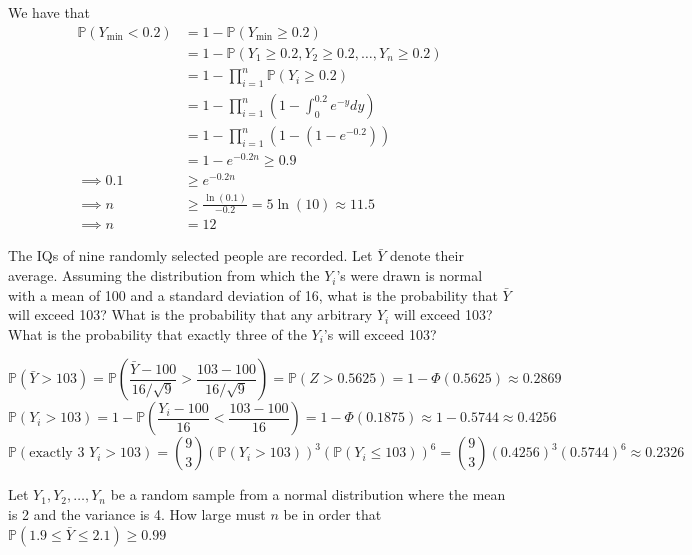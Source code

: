 \documentclass{article}
\renewcommand{\P}{\mathbb{P}}
\begin{document}
\begin{probset}
\begin{prob}[\textbf{3.10.6}]
    \begin{soln}
        We have that
        \begin{align*}
            \P(Y_{\min} < 0.2) &= 1 - \P(Y_{\min} \geq 0.2) \\
            &= 1 - \P(Y_1 \geq 0.2, Y_2 \geq 0.2, \ldots, Y_n \geq 0.2) \\
            &= 1 - \prod_{i=1}^n \P(Y_i \geq 0.2) \\
            &= 1 - \prod_{i=1}^n \left( 1 - \int_0^{0.2} e^{-y} dy \right) \\
            &= 1 - \prod_{i=1}^n \left( 1 - (1 - e^{-0.2}) \right) \\
            &= 1 - e^{-0.2n} \geq 0.9 \\ 
            \implies 0.1 &\geq e^{-0.2n} \\
            \implies n &\geq \frac{\ln(0.1)}{-0.2} = 5\ln(10) \approx 11.5 \\ 
            \implies n &= 12
        \end{align*}
    \end{soln}
\end{prob}

\begin{prob}[\textbf{4.3.33}]
    The IQs of nine randomly selected people are recorded. Let $\bar Y$ denote their average. Assuming the distribution from which the $Y_i$'s were drawn is normal with a mean of 100 and a standard deviation of 16, what is the probability that $\bar Y$ will exceed 103? What is the probability that any arbitrary $Y_i$ will exceed 103? What is the probability that exactly three of the $Y_i$'s will exceed 103?

    \begin{soln}
        \[
            \P(\bar Y > 103) = \P\left( \frac{\bar Y - 100}{16/\sqrt{9}} > \frac{103 - 100}{16/\sqrt{9}} \right) = \P(Z > 0.5625) = 1 - \Phi(0.5625) \approx 0.2869
        \]
        \[
            \P(Y_i > 103) = 1 - \P\left( \frac{Y_i - 100}{16} < \frac{103 - 100}{16} \right) = 1 - \Phi(0.1875) \approx 1 - 0.5744 \approx 0.4256
        \]
        \[
            \P(\text{exactly 3 }Y_i > 103) = \binom{9}{3} \left( \P(Y_i > 103) \right)^3 \left( \P(Y_i \leq 103) \right)^6 = \binom{9}{3} (0.4256)^3 (0.5744)^6 \approx 0.2326
        \]
    \end{soln}
\end{prob}

\newpage

\begin{prob}[\textbf{4.3.34}]
    Let $Y_1, Y_2, \ldots, Y_n$ be a random sample from a normal distribution where the mean is 2 and the variance is 4. How large must $n$ be in order that
    $\P(1.9 \leq \bar Y \leq 2.1) \geq 0.99$


\end{prob}
\end{probset}
\end{document}
